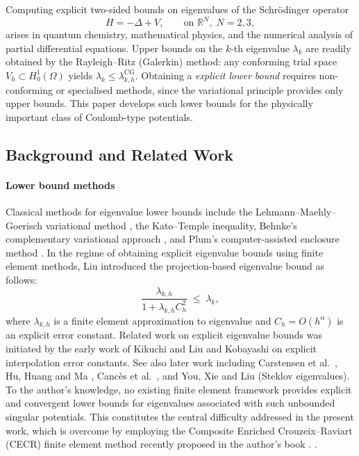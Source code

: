 \documentclass[11pt]{article}
\theoremstyle{plain}
\theoremstyle{definition}
\theoremstyle{remark}
\newcommand{\R}{\mathbb{R}}
\newcommand{\CG}{\mathrm{CG}}
\begin{document}
Computing explicit two-sided bounds on eigenvalues
of the Schr\"odinger operator
\begin{equation}
\label{eq:schrodinger}
  H = -\Delta + V, \qquad \text{on } \R^N,\; N=2,3,
\end{equation}
arises in quantum chemistry, mathematical physics, and the numerical
analysis of partial differential equations.  Upper bounds on the $k$-th
eigenvalue $\lambda_k$ are readily obtained by the Rayleigh--Ritz
(Galerkin) method: any conforming trial space $V_h \subset H^1_0(\Omega)$
yields $\lambda_k \le \lambda_{k,h}^{\CG}$.  Obtaining a
\emph{explicit lower bound} requires non-conforming or specialised
methods, since the variational principle provides only upper bounds.
This paper develops such lower bounds for the physically important
class of Coulomb-type potentials.

\subsection*{Background and Related Work}

\paragraph{Lower bound methods}
Classical methods for eigenvalue lower bounds include
the Lehmann--Maehly--Goerisch variational method
\cite{Goerisch1986}, the Kato--Temple inequality,
Behnke's complementary variational approach \cite{Behnke2000},
and Plum's computer-assisted enclosure method \cite{Plum1991}.
In the regime of obtaining explicit eigenvalue bounds using finite
element methods, Liu \cite{LiuOis2011,LiuOis2013,Liu2015}
introduced the projection-based eigenvalue bound as follows:
\begin{equation}
\label{eq:cecr-lb-intro}
  \frac{\lambda_{k,h}}{1 + \lambda_{k,h} C_h^2} \;\le\; \lambda_k,
\end{equation}
where $\lambda_{k,h}$ is a finite element approximation to  eigenvalue and
$C_h = O(h^\alpha)$ is an explicit error constant.
Related work on explicit eigenvalue bounds was initiated
by the early work of Kikuchi and Liu \cite{KikuchiLiu2007,LiuKikuchi}
and Kobayashi \cite{Kobayashi2011,Kobayashi2015} on explicit
interpolation error constants.  See also later work including
Carstensen et al.\
\cite{CarstensenGedicke2014,CarstensenGallistl2014},
Hu, Huang and Ma \cite{HuHuangMa2016},
Canc\`es et al.\ \cite{CancesDusson2017},
and You, Xie and Liu \cite{YouXieLiu2019} (Steklov eigenvalues).
%
To the author’s knowledge, no existing finite element framework provides explicit and convergent lower bounds for eigenvalues associated with such unbounded singular potentials. This constitutes the central difficulty addressed in the present work, which is overcome by employing the Composite Enriched Crouzeix–Raviart (CECR) finite element method recently proposed in the author’s book \cite[\S 4.1.3]{liu2024guaranteed}.
.
\end{document}

